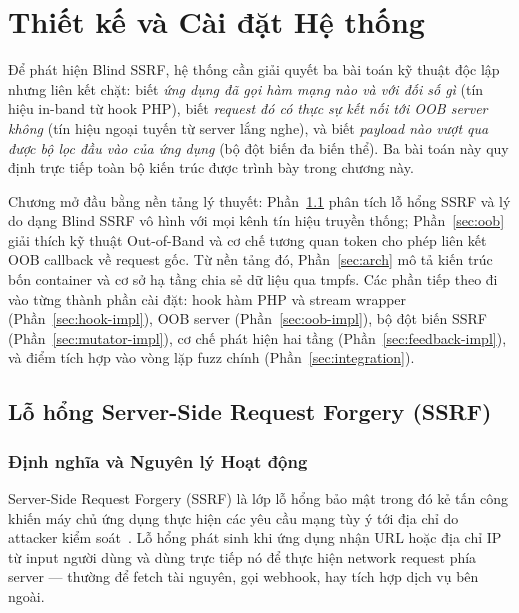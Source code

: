\chapter{Thiết kế và Cài đặt Hệ thống}

Để phát hiện Blind SSRF, hệ thống cần giải quyết ba bài toán kỹ thuật độc
lập nhưng liên kết chặt: biết \emph{ứng dụng đã gọi hàm mạng nào và với
đối số gì} (tín hiệu in-band từ hook PHP), biết \emph{request đó có thực
sự kết nối tới OOB server không} (tín hiệu ngoại tuyến từ server lắng
nghe), và biết \emph{payload nào vượt qua được bộ lọc đầu vào của ứng
dụng} (bộ đột biến đa biến thể). Ba bài toán này quy định trực tiếp toàn
bộ kiến trúc được trình bày trong chương này.

Chương mở đầu bằng nền tảng lý thuyết: Phần~\ref{sec:ssrf} phân tích lỗ
hổng SSRF và lý do dạng Blind SSRF vô hình với mọi kênh tín hiệu truyền
thống; Phần~\ref{sec:oob} giải thích kỹ thuật Out-of-Band và cơ chế tương
quan token cho phép liên kết OOB callback về request gốc. Từ nền tảng đó,
Phần~\ref{sec:arch} mô tả kiến trúc bốn container và cơ sở hạ tầng chia
sẻ dữ liệu qua tmpfs. Các phần tiếp theo đi vào từng thành phần cài đặt:
hook hàm PHP và stream wrapper (Phần~\ref{sec:hook-impl}), OOB server
(Phần~\ref{sec:oob-impl}), bộ đột biến SSRF (Phần~\ref{sec:mutator-impl}),
cơ chế phát hiện hai tầng (Phần~\ref{sec:feedback-impl}), và điểm tích
hợp vào vòng lặp fuzz chính (Phần~\ref{sec:integration}).

\section{Lỗ hổng Server-Side Request Forgery (SSRF)}
\label{sec:ssrf}

\subsection{Định nghĩa và Nguyên lý Hoạt động}

Server-Side Request Forgery (SSRF) là lớp lỗ hổng bảo mật trong đó kẻ tấn
công khiến máy chủ ứng dụng thực hiện các yêu cầu mạng tùy ý tới địa chỉ
do attacker kiểm soát~\cite{owasp2021top10, owasp2023ssrf}. Lỗ hổng phát
sinh khi ứng dụng nhận URL hoặc địa chỉ IP từ input người dùng và dùng trực
tiếp nó để thực hiện network request phía server --- thường để fetch tài
nguyên, gọi webhook, hay tích hợp dịch vụ bên ngoài.

